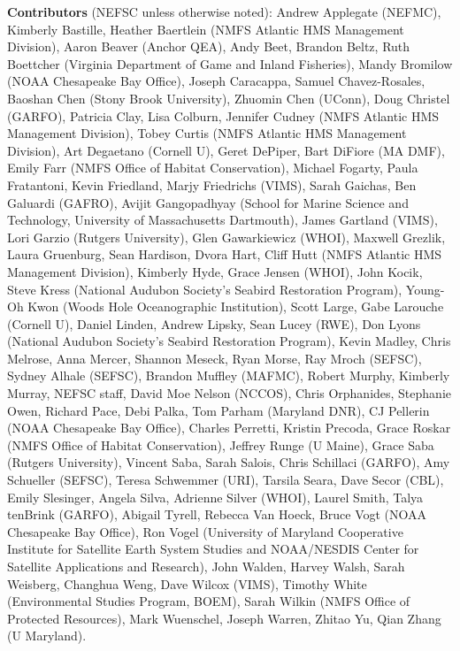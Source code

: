\documentclass[
  10pt,
]{article}
\begin{document}
\textbf{Contributors} (NEFSC unless otherwise noted): Andrew Applegate (NEFMC), Kimberly Bastille, Heather Baertlein (NMFS Atlantic HMS Management Division), Aaron Beaver (Anchor QEA), Andy Beet, Brandon Beltz, Ruth Boettcher (Virginia Department of Game and Inland Fisheries), Mandy Bromilow (NOAA Chesapeake Bay Office), Joseph Caracappa, Samuel Chavez-Rosales, Baoshan Chen (Stony Brook University), Zhuomin Chen (UConn), Doug Christel (GARFO), Patricia Clay, Lisa Colburn, Jennifer Cudney (NMFS Atlantic HMS Management Division), Tobey Curtis (NMFS Atlantic HMS Management Division), Art Degaetano (Cornell U), Geret DePiper, Bart DiFiore (MA DMF), Emily Farr (NMFS Office of Habitat Conservation), Michael Fogarty, Paula Fratantoni, Kevin Friedland, Marjy Friedrichs (VIMS), Sarah Gaichas, Ben Galuardi (GAFRO), Avijit Gangopadhyay (School for Marine Science and Technology, University of Massachusetts Dartmouth), James Gartland (VIMS), Lori Garzio (Rutgers University), Glen Gawarkiewicz (WHOI), Maxwell Grezlik, Laura Gruenburg, Sean Hardison, Dvora Hart, Cliff Hutt (NMFS Atlantic HMS Management Division), Kimberly Hyde, Grace Jensen (WHOI), John Kocik, Steve Kress (National Audubon Society's Seabird Restoration Program), Young-Oh Kwon (Woods Hole Oceanographic Institution), Scott Large, Gabe Larouche (Cornell U), Daniel Linden, Andrew Lipsky, Sean Lucey (RWE), Don Lyons (National Audubon Society's Seabird Restoration Program), Kevin Madley, Chris Melrose, Anna Mercer, Shannon Meseck, Ryan Morse, Ray Mroch (SEFSC), Sydney Alhale (SEFSC), Brandon Muffley (MAFMC), Robert Murphy, Kimberly Murray, NEFSC staff, David Moe Nelson (NCCOS), Chris Orphanides, Stephanie Owen, Richard Pace, Debi Palka, Tom Parham (Maryland DNR), CJ Pellerin (NOAA Chesapeake Bay Office), Charles Perretti, Kristin Precoda, Grace Roskar (NMFS Office of Habitat Conservation), Jeffrey Runge (U Maine), Grace Saba (Rutgers University), Vincent Saba, Sarah Salois, Chris Schillaci (GARFO), Amy Schueller (SEFSC), Teresa Schwemmer (URI), Tarsila Seara, Dave Secor (CBL), Emily Slesinger, Angela Silva, Adrienne Silver (WHOI), Laurel Smith, Talya tenBrink (GARFO), Abigail Tyrell, Rebecca Van Hoeck, Bruce Vogt (NOAA Chesapeake Bay Office), Ron Vogel (University of Maryland Cooperative Institute for Satellite Earth System Studies and NOAA/NESDIS Center for Satellite Applications and Research), John Walden, Harvey Walsh, Sarah Weisberg, Changhua Weng, Dave Wilcox (VIMS), Timothy White (Environmental Studies Program, BOEM), Sarah Wilkin (NMFS Office of Protected Resources), Mark Wuenschel, Joseph Warren, Zhitao Yu, Qian Zhang (U Maryland).
\end{document}

